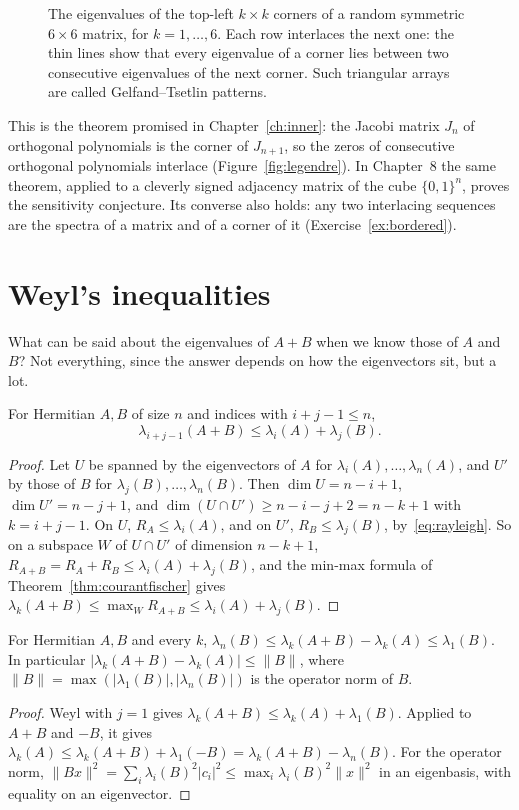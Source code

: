 \begin{figure}[ht]
\centering
{}
\caption{The eigenvalues of the top-left $k\times k$ corners of a random symmetric $6\times6$ matrix, for $k=1,\dots,6$.
Each row interlaces the next one: the thin lines show that every eigenvalue of a corner lies between two consecutive
eigenvalues of the next corner. Such triangular arrays are called Gelfand--Tsetlin patterns.}
\label{fig:interlace}
\end{figure}

This is the theorem promised in Chapter~\ref{ch:inner}: the Jacobi matrix $J_n$ of orthogonal polynomials is the corner of
$J_{n+1}$, so the zeros of consecutive orthogonal polynomials interlace (Figure~\ref{fig:legendre}). In Chapter~8 the same
theorem, applied to a cleverly signed adjacency matrix of the cube $\{0,1\}^n$, proves the sensitivity conjecture. Its converse
also holds: any two interlacing sequences are the spectra of a matrix and of a corner of it (Exercise~\ref{ex:bordered}).

\section{Weyl's inequalities}

What can be said about the eigenvalues of $A+B$ when we know those of $A$ and $B$? Not everything, since the answer depends
on how the eigenvectors sit, but a lot.

\begin{theorem}[Weyl, 1912]\label{thm:weyl}
For Hermitian $A,B$ of size $n$ and indices with $i+j-1\le n$,
\[
\lambda_{i+j-1}(A+B)\le\lambda_i(A)+\lambda_j(B).
\]
\end{theorem}
\begin{proof}
Let $U$ be spanned by the eigenvectors of $A$ for $\lambda_i(A),\dots,\lambda_n(A)$, and $U'$ by those of $B$ for
$\lambda_j(B),\dots,\lambda_n(B)$. Then $\dim U=n-i+1$, $\dim U'=n-j+1$, and $\dim(U\cap U')\ge n-i-j+2=n-k+1$ with
$k=i+j-1$. On $U$, $R_A\le\lambda_i(A)$, and on $U'$, $R_B\le\lambda_j(B)$, by~\eqref{eq:rayleigh}. So on a subspace $W$ of
$U\cap U'$ of dimension $n-k+1$, $R_{A+B}=R_A+R_B\le\lambda_i(A)+\lambda_j(B)$, and the min-max formula of
Theorem~\ref{thm:courantfischer} gives $\lambda_k(A+B)\le\max_WR_{A+B}\le\lambda_i(A)+\lambda_j(B)$.
\end{proof}

\begin{corollary}\label{cor:weylpert}
For Hermitian $A,B$ and every $k$, $\lambda_n(B)\le\lambda_k(A+B)-\lambda_k(A)\le\lambda_1(B)$. In particular
$|\lambda_k(A+B)-\lambda_k(A)|\le\|B\|$, where $\|B\|=\max(|\lambda_1(B)|,|\lambda_n(B)|)$ is the operator norm of $B$.
\end{corollary}
\begin{proof}
Weyl with $j=1$ gives $\lambda_k(A+B)\le\lambda_k(A)+\lambda_1(B)$. Applied to $A+B$ and $-B$, it gives $\lambda_k(A)\le
\lambda_k(A+B)+\lambda_1(-B)=\lambda_k(A+B)-\lambda_n(B)$. For the operator norm, $\|Bx\|^2=\sum_i\lambda_i(B)^2|c_i|^2\le
\max_i\lambda_i(B)^2\|x\|^2$ in an eigenbasis, with equality on an eigenvector.
\end{proof}

